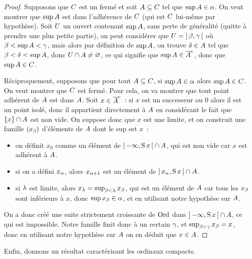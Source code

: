 \begin{proof}
  Supposons que $C$ est un fermé et soit $A\subseteq C$ tel que
  $\sup A \in \alpha$. On veut montrer que $\sup A$ est dans
  l'adhérence de $C$ (qui est $C$ lui-même par hypothèse). Soit
  $U$ un ouvert contenant $\sup A$, sans perte de généralité (quitte à
  prendre une plus petite partie), on peut considérer que
  $U = \mathord{\left]\,\beta,\gamma\,\right[}$ où
  $\beta < \sup A < \gamma$, mais alors par définition de $\sup A$,
  on trouve $\delta \in A$ tel que $\beta < \delta < \sup A$, donc
  $U \cap A \neq\varnothing$, ce qui signifie que
  $\sup A \in \overline{A}^{\mathrm c}$, donc que $\sup A \in C$.

  Réciproquement, supposons que pour tout $A\subseteq C$, si
  $\sup A \in \alpha$ alors $\sup A \in C$. On veut montrer que
  $C$ est fermé. Pour cela, on va montrer que tout point adhérent de
  $A$ est dans $A$. Soit $x \in \overline{A}^{\mathrm c}$~: si $x$ est un
  successeur ou $0$ alors il est un point isolé, donc il appartient directement
  à $A$ en considérant le fait que $\{x\}\cap A$ est non vide. On
  suppose donc que $x$ est une limite, et on construit une famille $(x_\beta)$
  d'éléments de $A$ dont le sup est $x$~:
  \begin{itemize}
  \item on définit $x_0$ comme un élément de $\mathord{\left]\,\mathord{-}\infty,\operatorname{S} x\,\right[}\cap A$,
    qui est non vide car $x$ est adhérent à $A$.
  \item si on a défini $x_\alpha$, alors $x_{\alpha + 1}$ est un élément de
    $\mathord{\left]\,x_\alpha,\operatorname{S} x\,\right[}\cap A$.
  \item si $\lambda$ est limite, alors
    $x_{\lambda}=\sup_{\beta < \lambda}x_\beta$, qui est un élément de $A$ car
    tous les $x_\beta$ sont inférieurs à $x$, donc $\sup x_\beta\in \alpha$,
    et en utilisant notre hypothèse sur $A$.
  \end{itemize}
  On a donc créé une suite strictement croissante de $\operatorname{Ord}$ dans
  $\mathord{\left]\,\mathord{-}\infty,\operatorname{S} x\,\right[}\cap A$, ce qui est impossible. Notre famille finit
  donc à un certain $\gamma$, et $\sup_{\beta < \gamma} x_\beta = x$, donc en
  utilisant notre hypothèse sur $A$ on en déduit que $x\in A$.
\end{proof}

\noindent
Enfin, donnons un résultat caractérisant les ordinaux compacts.

